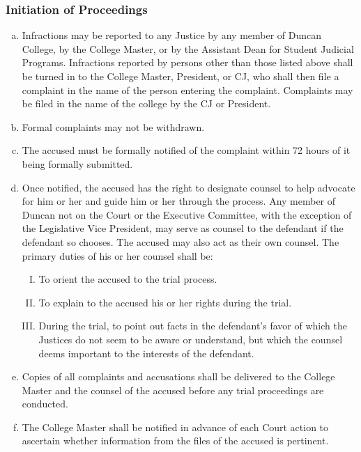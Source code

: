\documentclass[USletter,12pt]{article}
\begin{document}
\begin{enumerate}[(a)]
\subsubsection{Initiation of Proceedings}
\begin{enumerate}[(a)]
\item Infractions may be reported to any Justice by any member of Duncan College, by the College Master, or by the Assistant Dean for Student Judicial Programs. Infractions reported by persons other than those listed above shall be turned in to the College Master, President, or CJ, who shall then file a complaint in the name of the person entering the complaint.  Complaints may be filed in the name of the college by the CJ or President.
\item Formal complaints may not be withdrawn.
\item The accused must be formally notified of the complaint within 72 hours of it being formally submitted.
\item Once notified, the accused has the right to designate counsel to help advocate for him or her and guide him or her through the process.  Any member of Duncan not on the Court or the Executive Committee, with the exception of the Legislative Vice President, may serve as counsel to the defendant if the defendant so chooses.  The accused may also act as their own counsel.  The primary duties of his or her counsel shall be:
	\begin{enumerate}[(I)]
	\item To orient the accused to the trial process.
	\item To explain to the accused his or her rights during the trial.
	\item During the trial, to point out facts in the defendant's favor of which the Justices do not seem to be aware or understand, but which the counsel deems important to the interests of the defendant.
	\end{enumerate}
\item Copies of all complaints and accusations shall be delivered to the College Master and the counsel of the accused before any trial proceedings are conducted.
\item The College Master shall be notified in advance of each Court action to ascertain whether information from the files of the accused is pertinent.
\end{enumerate}


\end{enumerate}
\end{document}

